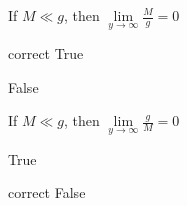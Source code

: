 \documentclass{ximera}
\author{Lee Wayand}
\begin{document}
\begin{exercise}




\begin{question}


If $M \ll g$, then $\lim\limits_{y \to \infty}\frac{M}{g} = 0$


\begin{multipleChoice}
\item [correct]{True}
\item {False}
\end{multipleChoice}


\end{question}







\begin{question}


If $M \ll g$, then $\lim\limits_{y \to \infty}\frac{g}{M} = 0$


\begin{multipleChoice}
\item {True}
\item [correct]{False}
\end{multipleChoice}


\end{question}









\end{exercise}
\end{document}
